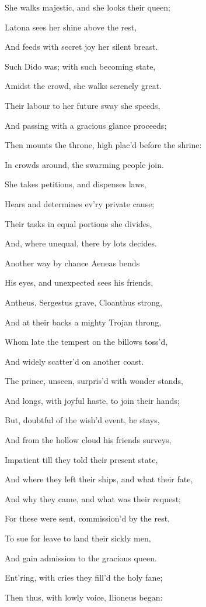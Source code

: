 She walks majestic, and she looks their queen;

Latona sees her shine above the rest,

And feeds with secret joy her silent breast.

Such Dido was; with such becoming state,

Amidst the crowd, she walks serenely great.

Their labour to her future sway she speeds,

And passing with a gracious glance proceeds;

Then mounts the throne, high plac’d before the shrine:

In crowds around, the swarming people join.

She takes petitions, and dispenses laws,

Hears and determines ev’ry private cause;

Their tasks in equal portions she divides,

And, where unequal, there by lots decides.

Another way by chance Aeneas bends

His eyes, and unexpected sees his friends,

Antheus, Sergestus grave, Cloanthus strong,

And at their backs a mighty Trojan throng,

Whom late the tempest on the billows toss’d,

And widely scatter’d on another coast.

The prince, unseen, surpris’d with wonder stands,

And longs, with joyful haste, to join their hands;

But, doubtful of the wish’d event, he stays,

And from the hollow cloud his friends surveys,

Impatient till they told their present state,

And where they left their ships, and what their fate,

And why they came, and what was their request;

For these were sent, commission’d by the rest,

To sue for leave to land their sickly men,

And gain admission to the gracious queen.

Ent’ring, with cries they fill’d the holy fane;

Then thus, with lowly voice, Ilioneus began:

